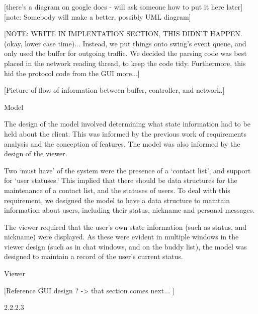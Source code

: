 [there's a diagram on google docs - will ask someone how to put it here later]
[note: Somebody will make a better, possibly UML diagram]

[NOTE: WRITE IN IMPLENTATION SECTION, THIS DIDN’T HAPPEN. (okay, lower case time)... Instead, we put things onto swing’s event queue, and only used the buffer for outgoing traffic. We decided the parsing code was best placed in the network reading thread, to keep the code tidy. Furthermore, this hid the protocol code from the GUI more...]

[Picture of flow of information between buffer, controller, and network.]

Model

The design of the model involved determining what state information had to be held about the client. This was informed by the previous work of requirements analysis and the conception of features. The model was also informed by the design of the viewer.

Two ‘must have’ of the system were the presence of a ‘contact list’, and support for ‘user statuses.’ This implied that there should be data structures for the maintenance of a contact list, and the statuses of users. To deal with this requirement, we designed the model to have a data structure to maintain information about users, including their status, nickname and personal messages. 

The viewer required that the user’s own state information (such as status, and nickname) were displayed. As these were evident in multiple windows in the viewer design (such as in chat windows, and on the buddy list), the model was designed to maintain a record of the user’s current status. 

Viewer

[Reference GUI design ? -> that section comes next... ]


2.2.2.3 





